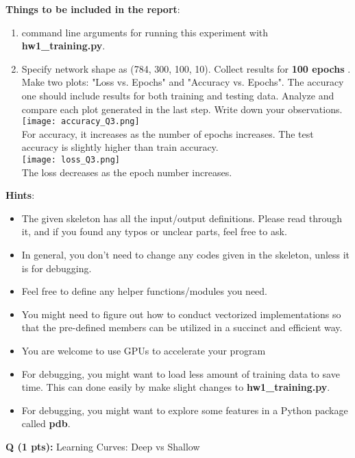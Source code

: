 \documentclass{article}
\newcommand{\homeworknumber}{1}
\newcounter{questionno}
\newcounter{partno}
\newcommand{\question}[1]{
\noindent
\newline
\stepcounter{questionno}
\setcounter{partno}{0}
{\bf Q\arabic{questionno} (#1 pts): }
}
\begin{document}
\noindent \textbf{Things to be included in the report}:
\begin{enumerate}
  \item command line arguments for running this experiment with \textbf{hw\homeworknumber\_training.py}. \\

  \item Specify network shape as (784, 300, 100, 10). Collect results for \textbf{100 epochs} .
        Make two plots: "Loss vs. Epochs" and "Accuracy vs. Epochs". The
        accuracy one should include results for both training and
        testing data. Analyze and compare each plot generated in the last step. Write down your observations.
        \texttt{[image: accuracy\_Q3.png]}
        \\For accuracy, it increases as the number of epochs increases. The test accuracy is slightly higher than train accuracy.
        \\
        \texttt{[image: loss\_Q3.png]}
        \\The loss decreases as the epoch number increases.

\end{enumerate}


\noindent \textbf{Hints}:
\begin{itemize}
    \item The given skeleton has all the input/output definitions. Please read through it, and if you found any typos or unclear parts, feel free to ask.
    \item In general, you don't need to change any codes given in the skeleton, unless it is for debugging.
    \item Feel free to define any helper functions/modules you need.
    \item You might need to figure out how to conduct vectorized implementations so that the pre-defined members can be utilized in a succinct and efficient way.
    \item You are welcome to use GPUs to accelerate your program
    \item For debugging, you might want to load less amount of training data to save time. This can done easily by make slight changes to \textbf{hw\homeworknumber\_training.py}.
    \item For debugging, you might want to explore some features in a Python package called \textbf{pdb}.
\end{itemize}


\newpage
\question{1}{Learning Curves: Deep vs Shallow}
\end{document}

